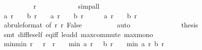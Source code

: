 \begin{isabellebody}
\ \ \ \ \ \ \ \ \isamarkupfalse%
\ r\ {\isacharasterisk}\ \isanewline
\ \ \ \ \ \ \ \ \isamarkupfalse%
\ simp{\isacharunderscore}all\isanewline
\ \ \ \ \ \ \isamarkupfalse%
\isanewline
\ \ \ \ \ \ \isamarkupfalse%
\ {\isachardoublequoteopen}a\ {\isacharparenleft}r\ {\isacharminus}\ {}{\isacharparenright}\ {\isacharequal}\ b\ {\isacharparenleft}r\ {\isacharminus}\ {}{\isacharparenright}\ {\isasymor}\ a\ {\isacharparenleft}r\ {\isacharminus}\ {}{\isacharparenright}\ {\isacharequal}\ b\ {\isacharparenleft}r\ {\isacharminus}\ {}{\isacharparenright}\ {\isacharplus}\ {}\ {\isasymor}\ a\ {\isacharparenleft}r\ {\isacharminus}\ {}{\isacharparenright}\ {\isacharequal}\ b\ {\isacharparenleft}r\ {\isacharminus}\ {}{\isacharparenright}\ {\isacharminus}\ {}{\isachardoublequoteclose}\isanewline
\ \ \ \ \ \ \ \ \isamarkupfalse%
\ ab{\isacharbrackleft}rule{\isacharunderscore}format{\isacharcomma}\ of\ {\isachardoublequoteopen}r{\isacharminus}{}{\isachardoublequoteclose}{\isacharbrackright}\ r\ False\isanewline
\ \ \ \ \ \ \ \ \isamarkupfalse%
\ auto\isanewline
\ \ \ \ \ \ \isamarkupfalse%
\isanewline
\ \ \ \ \ \ \isamarkupfalse%
\ {\isacharquery}thesis\isanewline
\ \ \ \ \ \ \ \ \isamarkupfalse%
\ {\isacharparenleft}smt\ diff{\isacharunderscore}le{\isacharunderscore}self\ eq{\isacharunderscore}iff\ le{\isacharunderscore}add{}\ max{\isachardot}commute\ max{\isachardot}mono{\isacharparenright}\isanewline
\ \ \ \ \isamarkupfalse%
\isanewline
\ \ \isamarkupfalse%
\isanewline
\isanewline
\ \ \isamarkupfalse%
\ min{\isacharunderscore}min{\isacharcolon}\ {\isachardoublequoteopen}{\isasymforall}r{\isachardot}\ {}\ {\isacharless}\ r\ {\isasymand}\ r\ {\isacharless}\ {}{}{}{}\ {\isasymlongrightarrow}\ min\ {\isacharparenleft}a\ {\isacharparenleft}r\ {\isacharminus}\ {}{\isacharparenright}{\isacharparenright}\ {\isacharparenleft}b\ {\isacharparenleft}r\ {\isacharminus}\ {}{\isacharparenright}{\isacharparenright}\ {\isasymge}\ min\ {\isacharparenleft}a\ r{\isacharparenright}\ {\isacharparenleft}b\ r{\isacharparenright}\ {\isacharminus}\ {}{\isachardoublequoteclose}\isanewline
\ \ \ \ \isamarkupfalse%
\ {\isachardoublequoteopen}{\isacharasterisk}{\isachardoublequoteclose}{\isacharparenleft}{}{\isacharparenright}\ {\isachardoublequoteopen}{\isacharasterisk}{\isachardoublequoteclose}{\isacharparenleft}{}{\isacharparenright}\ {\isachardoublequoteopen}{\isacharasterisk}{\isachardoublequoteclose}{\isacharparenleft}{}{\isacharparenright}\ {\isachardoublequoteopen}{\isacharasterisk}{\isachardoublequoteclose}{\isacharparenleft}{}{\isacharparenright}\ \isanewline

\end{isabellebody}
